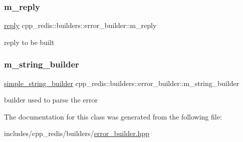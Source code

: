 \subsubsection{\texorpdfstring{m\+\_\+reply}{m\_reply}}
{\footnotesize\ttfamily \hyperlink{classcpp__redis_1_1reply}{reply} cpp\+\_\+redis\+::builders\+::error\+\_\+builder\+::m\+\_\+reply\hspace{0.3cm}{\ttfamily [private]}}

reply to be built \mbox{\label{classcpp__redis_1_1builders_1_1error__builder_abf711b6412187467e6a6fe77ca0cc1b7}} 
\subsubsection{\texorpdfstring{m\+\_\+string\+\_\+builder}{m\_string\_builder}}
{\footnotesize\ttfamily \hyperlink{classcpp__redis_1_1builders_1_1simple__string__builder}{simple\+\_\+string\+\_\+builder} cpp\+\_\+redis\+::builders\+::error\+\_\+builder\+::m\+\_\+string\+\_\+builder\hspace{0.3cm}{\ttfamily [private]}}

builder used to parse the error 

The documentation for this class was generated from the following file\+:\begin{DoxyCompactItemize}
\item 
includes/cpp\+\_\+redis/builders/\hyperlink{error__builder_8hpp}{error\+\_\+builder.\+hpp}\end{DoxyCompactItemize}
